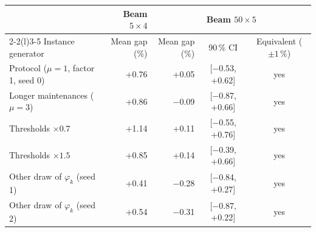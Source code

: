 \begin{tabular}{@{}lrrcc@{}}
\toprule
 & Beam $5 \times 4$ & \multicolumn{3}{c}{Beam $50 \times 5$} \\
\cmidrule(lr){2-2}\cmidrule(l){3-5}
Instance generator & Mean gap (\%) & Mean gap (\%) & 90\,\% CI & Equivalent ($\pm 1\,\%$) \\
\midrule
Protocol ($\mu = 1$, factor 1, seed 0) & +0.76 & +0.05 & [$-$0.53, +0.62] & yes \\
Longer maintenances ($\mu = 3$) & +0.86 & $-$0.09 & [$-$0.87, +0.66] & yes \\
Thresholds $\times 0.7$ & +1.14 & +0.11 & [$-$0.55, +0.76] & yes \\
Thresholds $\times 1.5$ & +0.85 & +0.14 & [$-$0.39, +0.66] & yes \\
Other draw of $\varphi_k$ (seed 1) & +0.41 & $-$0.28 & [$-$0.84, +0.27] & yes \\
Other draw of $\varphi_k$ (seed 2) & +0.54 & $-$0.31 & [$-$0.87, +0.22] & yes \\
\bottomrule
\end{tabular}
